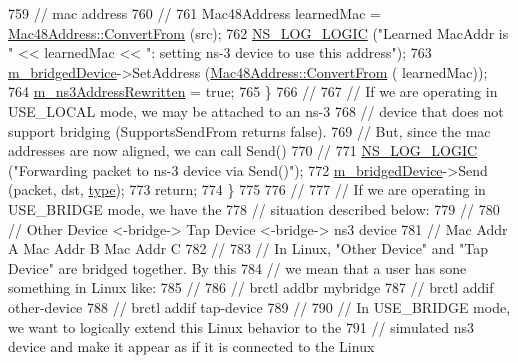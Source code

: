 \begin{DoxyCode}
759           \textcolor{comment}{// mac address}
760           \textcolor{comment}{//}
761           Mac48Address learnedMac = \hyperlink{classns3_1_1Mac48Address_a911ce13603a9ef837545a032b6523ae4}{Mac48Address::ConvertFrom} (src);
762           \hyperlink{group__logging_ga88acd260151caf2db9c0fc84997f45ce}{NS\_LOG\_LOGIC} (\textcolor{stringliteral}{"Learned MacAddr is "} << learnedMac << \textcolor{stringliteral}{": setting ns-3 device to use
       this address"});
763           \hyperlink{classns3_1_1TapBridge_ac4ba97368116b628d632d318d5562420}{m\_bridgedDevice}->SetAddress (\hyperlink{classns3_1_1Mac48Address_a911ce13603a9ef837545a032b6523ae4}{Mac48Address::ConvertFrom} (
      learnedMac));
764           \hyperlink{classns3_1_1TapBridge_a3200dc6b4b46d2f0fb13c867fcb0d118}{m\_ns3AddressRewritten} = \textcolor{keyword}{true};
765         \}
766       \textcolor{comment}{// }
767       \textcolor{comment}{// If we are operating in USE\_LOCAL mode, we may be attached to an ns-3}
768       \textcolor{comment}{// device that does not support bridging (SupportsSendFrom returns false).}
769       \textcolor{comment}{// But, since the mac addresses are now aligned, we can call Send()}
770       \textcolor{comment}{//}
771       \hyperlink{group__logging_ga88acd260151caf2db9c0fc84997f45ce}{NS\_LOG\_LOGIC} (\textcolor{stringliteral}{"Forwarding packet to ns-3 device via Send()"});
772       \hyperlink{classns3_1_1TapBridge_ac4ba97368116b628d632d318d5562420}{m\_bridgedDevice}->Send (packet, dst, \hyperlink{visualizer-ideas_8txt_add98db9e15e2a58cf2b57623e7aa893a}{type});
773       \textcolor{keywordflow}{return};
774     \}
775 
776   \textcolor{comment}{//}
777   \textcolor{comment}{// If we are operating in USE\_BRIDGE mode, we have the }
778   \textcolor{comment}{// situation described below:}
779   \textcolor{comment}{//}
780   \textcolor{comment}{//  Other Device  <-bridge->  Tap Device  <-bridge-> ns3 device}
781   \textcolor{comment}{//   Mac Addr A               Mac Addr B             Mac Addr C}
782   \textcolor{comment}{//}
783   \textcolor{comment}{// In Linux, "Other Device" and "Tap Device" are bridged together.  By this}
784   \textcolor{comment}{// we mean that a user has sone something in Linux like:}
785   \textcolor{comment}{//}
786   \textcolor{comment}{//   brctl addbr mybridge}
787   \textcolor{comment}{//   brctl addif other-device}
788   \textcolor{comment}{//   brctl addif tap-device}
789   \textcolor{comment}{//}
790   \textcolor{comment}{// In USE\_BRIDGE mode, we want to logically extend this Linux behavior to the }
791   \textcolor{comment}{// simulated ns3 device and make it appear as if it is connected to the Linux}

\end{DoxyCode}
